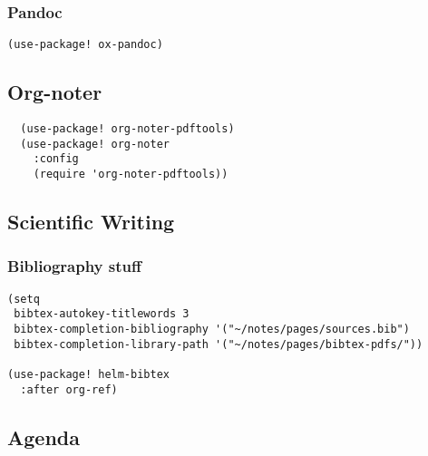 \documentclass[11pt]{article}
\begin{document}
\subsubsection{Pandoc}
\label{sec:orgfbffd64}
\begin{verbatim}
(use-package! ox-pandoc)
\end{verbatim}

\subsection{Org-noter}
\label{sec:org808be98}
\begin{verbatim}
  (use-package! org-noter-pdftools)
  (use-package! org-noter
    :config
    (require 'org-noter-pdftools))
\end{verbatim}
\subsection{Scientific Writing}
\label{sec:org9174e93}

\subsubsection{Bibliography stuff}
\label{sec:orgcba434b}
\begin{verbatim}
(setq
 bibtex-autokey-titlewords 3
 bibtex-completion-bibliography '("~/notes/pages/sources.bib")
 bibtex-completion-library-path '("~/notes/pages/bibtex-pdfs/"))

(use-package! helm-bibtex
  :after org-ref)
\end{verbatim}

\subsection{Agenda}
\label{sec:orgf962fdc}
\end{document}
